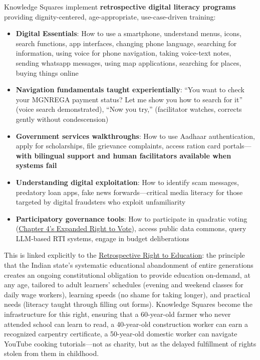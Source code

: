 Knowledge Squares implement \textbf{retrospective digital literacy
programs} providing dignity-centered, age-appropriate, use-case-driven
training:

\begin{itemize}
\tightlist
\item
  \textbf{Digital Essentials}: How to use a smartphone, understand
  menus, icons, search functions, app interfaces, changing phone
  language, searching for information, using voice for phone navigation,
  taking voice-text notes, sending whatsapp messages, using map
  applications, searching for places, buying things online
\item
  \textbf{Navigation fundamentals taught experientially}: ``You want to
  check your MGNREGA payment status? Let me show you how to search for
  it'' (voice search demonstrated), ``Now you try,'' (facilitator
  watches, corrects gently without condescension)
\item
  \textbf{Government services walkthroughs}: How to use Aadhaar
  authentication, apply for scholarships, file grievance complaints,
  access ration card portals---\textbf{with bilingual support and human
  facilitators available when systems fail}
\item
  \textbf{Understanding digital exploitation}: How to identify scam
  messages, predatory loan apps, fake news forwards---critical media
  literacy for those targeted by digital fraudsters who exploit
  unfamiliarity
\item
  \textbf{Participatory governance tools}: How to participate in
  quadratic voting (\hyperref[4-expanded-right-to-vote]{Chapter 4's
  Expanded Right to Vote}), access public data commons, query LLM-based
  RTI systems, engage in budget deliberations
\end{itemize}

This is linked explicitly to the
\hyperref[633-restrospective-right-to-education]{Retrospective Right to
Education}: the principle that the Indian state's systematic educational
abandonment of entire generations creates an ongoing constitutional
obligation to provide education on-demand, at any age, tailored to adult
learners' schedules (evening and weekend classes for daily wage
workers), learning speeds (no shame for taking longer), and practical
needs (literacy taught through filling out forms). Knowledge Squares
become the infrastructure for this right, ensuring that a 60-year-old
farmer who never attended school can learn to read, a 40-year-old
construction worker can earn a recognized carpentry certificate, a
50-year-old domestic worker can navigate YouTube cooking tutorials---not
as charity, but as the delayed fulfillment of rights stolen from them in
childhood.

